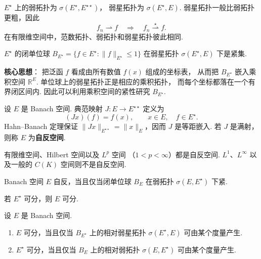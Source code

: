 \begin{proposition}[弱拓扑与弱星拓扑的比较]
    $E^\star$ 上的弱拓扑为
    $\sigma(E^\star,E^{\star\star})$，
    弱星拓扑为 $\sigma(E^\star,E)$.
    弱星拓扑一般比弱拓扑更粗，因此
    \[
        f_n\rightharpoonup f
        \quad\Longrightarrow\quad
        f_n\overset{\star}{\rightharpoonup}f.
    \]
    在有限维空间中，范数拓扑、弱拓扑和弱星拓扑彼此相同.
\end{proposition}

\begin{theorem}
    $E^\star$ 的闭单位球
    $B_{E^\star}=\{f\in E^\star:\|f\|_{E^\star}\le1\}$
    在弱星拓扑 $\sigma(E^\star,E)$ 下是紧集.
\end{theorem}

\begin{remarkbox}
    \textbf{核心思想}：
    把泛函 $f$ 看成由所有数值 $f(x)$ 组成的坐标表，
    从而把 $B_{E^\star}$ 嵌入乘积空间 $\mathbb{R}^E$.
    单位球上的弱星拓扑正是相应的乘积拓扑，
    而每个坐标都落在一个有界闭区间内.
    因此可以利用乘积空间的紧性研究 $B_{E^\star}$.
\end{remarkbox}


\begin{definition}[典范映射与自反空间]
    设 $E$ 是 Banach 空间.
    典范映射 $J:E\to E^{\star\star}$ 定义为
    \[
        (Jx)(f)=f(x),
        \qquad x\in E,\quad f\in E^\star.
    \]
    Hahn--Banach 定理保证
    $\|Jx\|_{E^{\star\star}}=\|x\|_E$，因而 $J$ 是等距嵌入.
    若 $J$ 是满射，则称 $E$ 为\textbf{自反空间}.
\end{definition}

\begin{example}[自反与非自反空间]
    有限维空间、Hilbert 空间以及 $L^p$ 空间
    （$1<p<\infty$）都是自反空间.
    $L^1$、$L^\infty$ 以及一般的 $C(K)$ 空间则不是自反空间.
\end{example}

\begin{theorem}[Kakutani 定理]
    Banach 空间 $E$ 自反，当且仅当闭单位球 $B_E$
    在弱拓扑 $\sigma(E,E^\star)$ 下紧.
\end{theorem}


\begin{proposition}[可分性的关系]
    若 $E^\star$ 可分，则 $E$ 可分.
\end{proposition}

\begin{proposition}[单位球上拓扑的可度量化]
    设 $E$ 是 Banach 空间.
    \begin{enumerate}
        \item $E$ 可分，当且仅当 $B_{E^\star}$ 上的相对弱星拓扑
        $\sigma(E^\star,E)$ 可由某个度量产生.
        \item $E^\star$ 可分，当且仅当 $B_E$ 上的相对弱拓扑
        $\sigma(E,E^\star)$ 可由某个度量产生.
    \end{enumerate}
\end{proposition}

